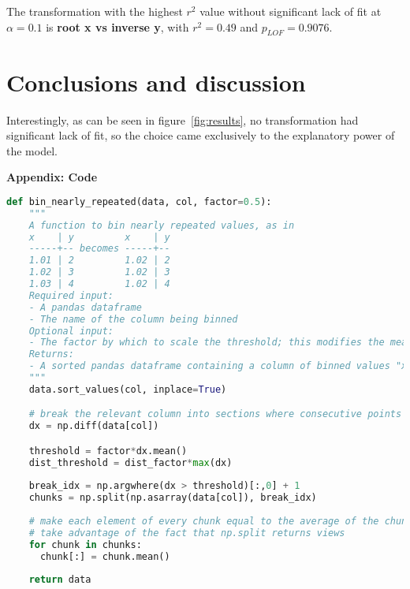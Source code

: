\documentclass[12pt, letterpaper]{article}
\begin{document}
The transformation with the highest \(r^2\) value without significant lack of fit at \(\alpha=0.1\) is \textbf{root x vs inverse y}, with \(r^2=0.49\) and \(p_{LOF}=0.9076\).

\section*{Conclusions and discussion}
Interestingly, as can be seen in figure~\ref{fig:results}, no transformation had significant lack of fit, so the choice came exclusively to the explanatory power of the model.

\newpage
\textbf{Appendix: Code}

\begin{lstlisting}[language=Python, caption=Python bin data according to the didstance between consecutive independent values,  label={lst:bin}]
def bin_nearly_repeated(data, col, factor=0.5):
    """
    A function to bin nearly repeated values, as in
    x    | y         x    | y
    -----+-- becomes -----+--
    1.01 | 2         1.02 | 2
    1.02 | 3         1.02 | 3
    1.03 | 4         1.02 | 4
    Required input:
    - A pandas dataframe
    - The name of the column being binned
    Optional input:
    - The factor by which to scale the threshold; this modifies the mean of the diff and is set to 0.5 by default
    Returns:
    - A sorted pandas dataframe containing a column of binned values "x" with their corresponding values "y", equal in length to the input dataframe
    """
    data.sort_values(col, inplace=True)

    # break the relevant column into sections where consecutive points are within the threshold from each other
    dx = np.diff(data[col])

    threshold = factor*dx.mean()
    dist_threshold = dist_factor*max(dx)
    
    break_idx = np.argwhere(dx > threshold)[:,0] + 1
    chunks = np.split(np.asarray(data[col]), break_idx)
    
    # make each element of every chunk equal to the average of the chunk
    # take advantage of the fact that np.split returns views
    for chunk in chunks:
      chunk[:] = chunk.mean()
      
    return data
\end{lstlisting}
\end{document}
